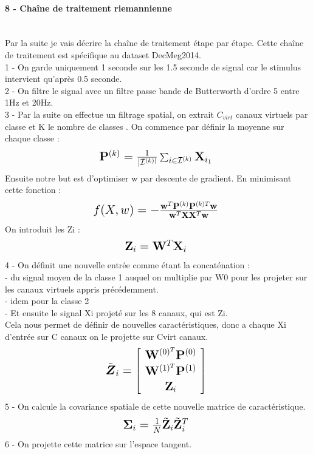 \documentclass{article}[12pt]
\begin{document}
\paragraph{8 - Chaîne de traitement riemannienne}\mbox{}\\
Par la suite je vais décrire la chaîne de traitement étape par étape. Cette chaîne de traitement est spécifique au dataset DecMeg2014.\\
1 - On garde uniquement 1 seconde sur les 1.5 seconde de signal car le stimulus intervient qu’après 0.5 seconde. \\
2 - On filtre le signal avec un filtre passe bande de Butterworth d'ordre 5 entre 1Hz et 20Hz.\\
3 - Par la suite on effectue un filtrage spatial, on extrait $C_{virt}$ canaux virtuels par classe et K le nombre de classes \cite{Blankertz 01 ou 03}. On commence par définir la moyenne sur chaque classe :
$$ \mbox{\Large $ 
\mathbf{P}^{(k)}=\frac{1}{ | \mathcal{I}^{(k) |}} \sum_{i \in \mathcal{I}^{(k)}} \mathbf{X}_{i_{1}}
$ } $$
Ensuite notre but est d'optimiser w par descente de gradient. En minimisant cette fonction :
$$ \mbox{\Large $ 
f(X,w)=- \frac{\mathbf{w}^{T} \mathbf{P}^{(k)} \mathbf{P}^{(k) T} \mathbf{w}}{\mathbf{w}^{T} \mathbf{X} \mathbf{X}^{T} \mathbf{w}}
$ } $$
On introduit les Zi :
$$ \mbox{\Large $ 
\mathbf{Z}_{i}=\mathbf{W}^{T} \mathbf{X}_{i}
$ } $$
4 - On définit une nouvelle entrée comme étant la concaténation :\\
- du signal moyen de la classe 1 auquel on multiplie par W0 pour les projeter sur les canaux virtuels appris précédemment.\\
- idem pour la classe 2\\
- Et ensuite le signal Xi projeté sur les 8 canaux, qui est Zi.\\
Cela nous permet de définir de nouvelles caractéristiques, donc a chaque Xi d'entrée sur C canaux on le projette sur Cvirt canaux.
$$ \mbox{\Large $ 
\tilde{\boldsymbol{Z}}_{i}=\left[ \begin{array}{c}{\mathbf{W}^{(0)^{T}} \mathbf{P}^{(0)}} \\ {\mathbf{W}^{(1)^{T}} \mathbf{P}^{(1)}} \\ {\mathbf{Z}_{i}}\end{array}\right]
$ } $$
5 - On calcule la covariance spatiale de cette nouvelle matrice de caractéristique.
$$ \mbox{\Large $ 
\boldsymbol{\Sigma}_{i}=\frac{1}{N} \tilde{\mathbf{Z}}_{i} \tilde{\mathbf{Z}}_{i}^{T}
$ } $$
6 - On projette cette matrice sur l'espace tangent.\\
\end{document}

